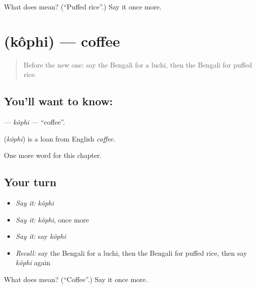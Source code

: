 \begin{tcolorbox}[breakable,colback=teal!4,colframe=teal!35!black,title={Before you move on}]
What does  mean? (\textquotedblleft{}Puffed rice\textquotedblright{}.) Say it once more.
\end{tcolorbox}
\section[\texorpdfstring{\bn{কফি} (kôphi)}{কফি (kôphi)}]{ (kôphi) — coffee}

\label{lesson:BN-C118-kophi}



\begin{quote}
Before the new one: say the Bengali for a luchi, then the Bengali for puffed rice.
\end{quote}

\subsection*{You'll want to know: }
\textbf{} — \emph{kôphi} — \textquotedblleft{}coffee\textquotedblright{}.

\begin{cousinweb}
\textbf{} (\emph{kôphi}) is a loan from English \emph{coffee}.
\end{cousinweb}

\begin{grammarlens}[title={What you've built}]
One more word for this chapter.
\end{grammarlens}

\subsection*{Your turn}
\begin{itemize}
\raggedright
  \item \emph{Say it:} \emph{kôphi}
  \item \emph{Say it:} \emph{kôphi}, once more
  \item \emph{Say it:} say \emph{kôphi}
  \item \emph{Recall:} say the Bengali for a luchi, then the Bengali for puffed rice, then say \emph{kôphi} again
\end{itemize}

\begin{tcolorbox}[breakable,colback=teal!4,colframe=teal!35!black,title={Before you move on}]
What does  mean? (\textquotedblleft{}Coffee\textquotedblright{}.) Say it once more.
\end{tcolorbox}
